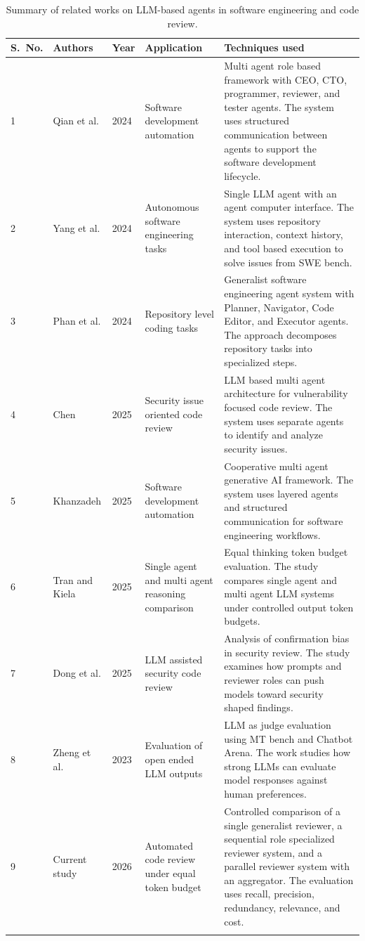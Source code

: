 \documentclass[pdflatex,sn-mathphys-num]{sn-jnl}
\theoremstyle{thmstyleone}
\theoremstyle{thmstyletwo}
\theoremstyle{thmstylethree}
\begin{document}
\begin{table}[ht]
\caption{Summary of related works on LLM-based agents in software engineering and code review.}
\label{tab:related_works}
\footnotesize
\begin{tabular}{@{}p{0.5cm}p{2.1cm}p{0.7cm}p{2.2cm}p{5.0cm}@{}}
\toprule
S.~No. & Authors & Year & Application & Techniques used \\
\midrule
1 & Qian et al. & 2024 & Software development automation & Multi agent role based framework with CEO, CTO, programmer, reviewer, and tester agents. The system uses structured communication between agents to support the software development lifecycle. \\
\midrule
2 & Yang et al. & 2024 & Autonomous software engineering tasks & Single LLM agent with an agent computer interface. The system uses repository interaction, context history, and tool based execution to solve issues from SWE bench. \\
\midrule
3 & Phan et al. & 2024 & Repository level coding tasks & Generalist software engineering agent system with Planner, Navigator, Code Editor, and Executor agents. The approach decomposes repository tasks into specialized steps. \\
\midrule
4 & Chen & 2025 & Security issue oriented code review & LLM based multi agent architecture for vulnerability focused code review. The system uses separate agents to identify and analyze security issues. \\
\midrule
5 & Khanzadeh & 2025 & Software development automation & Cooperative multi agent generative AI framework. The system uses layered agents and structured communication for software engineering workflows. \\
\midrule
6 & Tran and Kiela & 2025 & Single agent and multi agent reasoning comparison & Equal thinking token budget evaluation. The study compares single agent and multi agent LLM systems under controlled output token budgets. \\
\midrule
7 & Dong et al. & 2025 & LLM assisted security code review & Analysis of confirmation bias in security review. The study examines how prompts and reviewer roles can push models toward security shaped findings. \\
\midrule
8 & Zheng et al. & 2023 & Evaluation of open ended LLM outputs & LLM as judge evaluation using MT bench and Chatbot Arena. The work studies how strong LLMs can evaluate model responses against human preferences. \\
\midrule
9 & Current study & 2026 & Automated code review under equal token budget & Controlled comparison of a single generalist reviewer, a sequential role specialized reviewer system, and a parallel reviewer system with an aggregator. The evaluation uses recall, precision, redundancy, relevance, and cost. \\
\botrule
\end{tabular}
\end{table}
\end{document}
